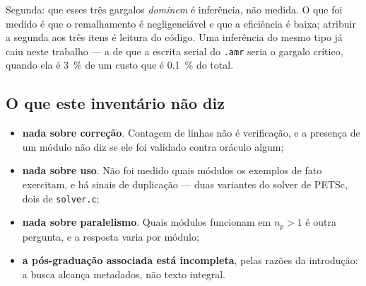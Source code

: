 Segunda: que esses tr\^es gargalos \emph{dominem} \'e infer\^encia, n\~ao medida.
O que foi medido \'e que o remalhamento \'e negligenci\'avel e que a efici\^encia
\'e baixa; atribuir a segunda aos tr\^es itens \'e leitura do c\'odigo. Uma
infer\^encia do mesmo tipo j\'a caiu neste trabalho --- a de que a escrita serial
do \texttt{.amr} seria o gargalo cr\'itico, quando ela \'e \SI{3}{\percent} de um
custo que \'e \SI{0.1}{\percent} do total.

\subsection{O que este invent\'ario n\~ao diz}

\begin{itemize}
  \item \textbf{nada sobre corre\c{c}\~ao}. Contagem de linhas n\~ao \'e
    verifica\c{c}\~ao, e a presen\c{c}a de um m\'odulo n\~ao diz se ele foi
    validado contra or\'aculo algum;
  \item \textbf{nada sobre uso}. N\~ao foi medido quais m\'odulos os exemplos
    de fato exercitam, e h\'a sinais de duplica\c{c}\~ao --- duas variantes do
    solver de PETSc, dois de \texttt{solver.c};
  \item \textbf{nada sobre paralelismo}. Quais m\'odulos funcionam em $n_p>1$
    \'e outra pergunta, e a resposta varia por m\'odulo;
  \item \textbf{a p\'os-gradua\c{c}\~ao associada est\'a incompleta}, pelas
    raz\~oes da introdu\c{c}\~ao: a busca alcan\c{c}a metadados, n\~ao texto
    integral.
\end{itemize}
